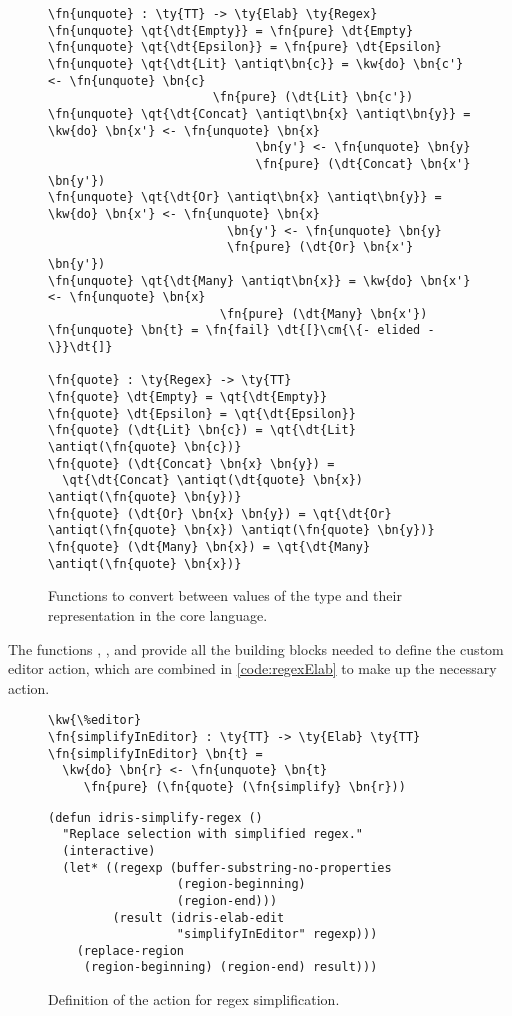 \begin{figure}
\begin{Verbatim}
\fn{unquote} : \ty{TT} -> \ty{Elab} \ty{Regex}
\fn{unquote} \qt{\dt{Empty}} = \fn{pure} \dt{Empty}
\fn{unquote} \qt{\dt{Epsilon}} = \fn{pure} \dt{Epsilon}
\fn{unquote} \qt{\dt{Lit} \antiqt\bn{c}} = \kw{do} \bn{c'} <- \fn{unquote} \bn{c}
                       \fn{pure} (\dt{Lit} \bn{c'})
\fn{unquote} \qt{\dt{Concat} \antiqt\bn{x} \antiqt\bn{y}} = \kw{do} \bn{x'} <- \fn{unquote} \bn{x}
                             \bn{y'} <- \fn{unquote} \bn{y}
                             \fn{pure} (\dt{Concat} \bn{x'} \bn{y'})
\fn{unquote} \qt{\dt{Or} \antiqt\bn{x} \antiqt\bn{y}} = \kw{do} \bn{x'} <- \fn{unquote} \bn{x}
                         \bn{y'} <- \fn{unquote} \bn{y}
                         \fn{pure} (\dt{Or} \bn{x'} \bn{y'})
\fn{unquote} \qt{\dt{Many} \antiqt\bn{x}} = \kw{do} \bn{x'} <- \fn{unquote} \bn{x}
                        \fn{pure} (\dt{Many} \bn{x'})
\fn{unquote} \bn{t} = \fn{fail} \dt{[}\cm{\{- elided -\}}\dt{]}

\fn{quote} : \ty{Regex} -> \ty{TT}
\fn{quote} \dt{Empty} = \qt{\dt{Empty}}
\fn{quote} \dt{Epsilon} = \qt{\dt{Epsilon}}
\fn{quote} (\dt{Lit} \bn{c}) = \qt{\dt{Lit} \antiqt(\fn{quote} \bn{c})}
\fn{quote} (\dt{Concat} \bn{x} \bn{y}) =
  \qt{\dt{Concat} \antiqt(\dt{quote} \bn{x}) \antiqt(\fn{quote} \bn{y})}
\fn{quote} (\dt{Or} \bn{x} \bn{y}) = \qt{\dt{Or} \antiqt(\fn{quote} \bn{x}) \antiqt(\fn{quote} \bn{y})}
\fn{quote} (\dt{Many} \bn{x}) = \qt{\dt{Many} \antiqt(\fn{quote} \bn{x})}
\end{Verbatim}
\caption{Functions to convert between values of the  type and their representation in the core language.}
\label{code:regexQuote}
\end{figure}

The functions , , and  provide all the
building blocks needed to define the custom editor action, which are combined in
\autoref{code:regexElab} to make up the necessary \Elab{} action.

\begin{figure}[ht]
\begin{Verbatim}
\kw{\%editor}
\fn{simplifyInEditor} : \ty{TT} -> \ty{Elab} \ty{TT}
\fn{simplifyInEditor} \bn{t} =
  \kw{do} \bn{r} <- \fn{unquote} \bn{t}
     \fn{pure} (\fn{quote} (\fn{simplify} \bn{r}))
\end{Verbatim}
\hrulefill
\begin{Verbatim}
(defun idris-simplify-regex ()
  "Replace selection with simplified regex."
  (interactive)
  (let* ((regexp (buffer-substring-no-properties
                  (region-beginning)
                  (region-end)))
         (result (idris-elab-edit
                  "simplifyInEditor" regexp)))
    (replace-region
     (region-beginning) (region-end) result)))
\end{Verbatim}
\caption{Definition of the \Elab{} action for regex simplification.}
\label{code:regexElab}
\end{figure}

